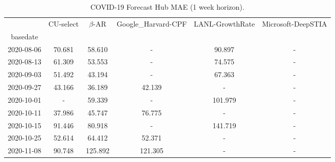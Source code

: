 \begin{table*}[t]
\small
\caption{COVID-19 Forecast Hub MAE (1 week horizon).\label{tab:reichalb_eval_1} }

\centering
    
\begin{tabular}{cccccc}
\toprule
{} &                      CU-select &                     $\beta$-AR &            Google\_Harvard-CPF &                LANL-GrowthRate &            Microsoft-DeepSTIA \\
basedate   &                                &                                &                                &                                &                               \\
\midrule
2020-08-06 &                         70.681 &   {\cellcolor{blue!25} 58.610} &                              - &                         90.897 &                             - \\
2020-08-13 &                         61.309 &   {\cellcolor{blue!25} 53.553} &                              - &                         74.575 &                             - \\
2020-09-03 &                         51.492 &   {\cellcolor{blue!25} 43.194} &                              - &                         67.363 &                             - \\
2020-09-27 &                         43.166 &   {\cellcolor{blue!25} 36.189} &                         42.139 &                              - &                             - \\
2020-10-01 &                              - &   {\cellcolor{blue!25} 59.339} &                              - &                        101.979 &                             - \\
2020-10-11 &   {\cellcolor{blue!25} 37.986} &                         45.747 &                         76.775 &                              - &                             - \\
2020-10-15 &                         91.446 &   {\cellcolor{blue!25} 80.918} &                              - &                        141.719 &                             - \\
2020-10-25 &                         52.614 &                         64.412 &   {\cellcolor{blue!25} 52.371} &                              - &                             - \\
2020-11-08 &   {\cellcolor{blue!25} 90.748} &                        125.892 &                        121.305 &                              - &                             - \\

\end{tabular}
\end{table*}

